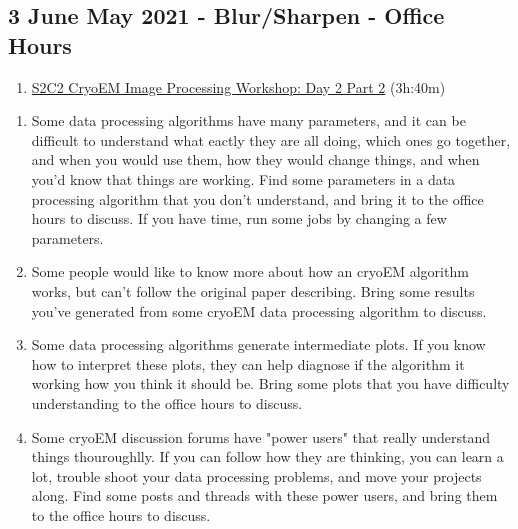 \documentclass[11pt, oneside]{article}   	%
\begin{document}
\subsection{3 June May 2021 - Blur/Sharpen - Office Hours}
\begin{enumerate}
	\item \href{https://youtu.be/HXIipHORI2Y}{S2C2 CryoEM Image Processing Workshop: Day 2 Part 2} (3h:40m)
	\end{enumerate}
\begin{enumerate}
	\item Some data processing algorithms have many parameters, and it can be difficult to understand what eactly they are all doing, which ones go together, and when you would use them, how they would change things, and when you'd know that things are working. Find some parameters in a data processing algorithm that you don't understand, and bring it to the office hours to discuss. If you have time, run some jobs by changing a few parameters.
	\item Some people would like to know more about how an cryoEM algorithm works, but can't follow the original paper describing. Bring some results you've generated from some cryoEM data processing algorithm to discuss.
	\item Some data processing algorithms generate intermediate plots. If you know how to interpret these plots, they can help diagnose if the algorithm it working how you think it should be. Bring some plots that you have difficulty understanding to the office hours to discuss.  
	\item Some cryoEM discussion forums have "power users" that really understand things thouroughlly. If you can follow how they are thinking, you can learn a lot, trouble shoot your data processing problems, and move your projects along. Find some posts and threads with these power users, and bring them to the office hours to discuss.
\end{enumerate}
\end{document}
